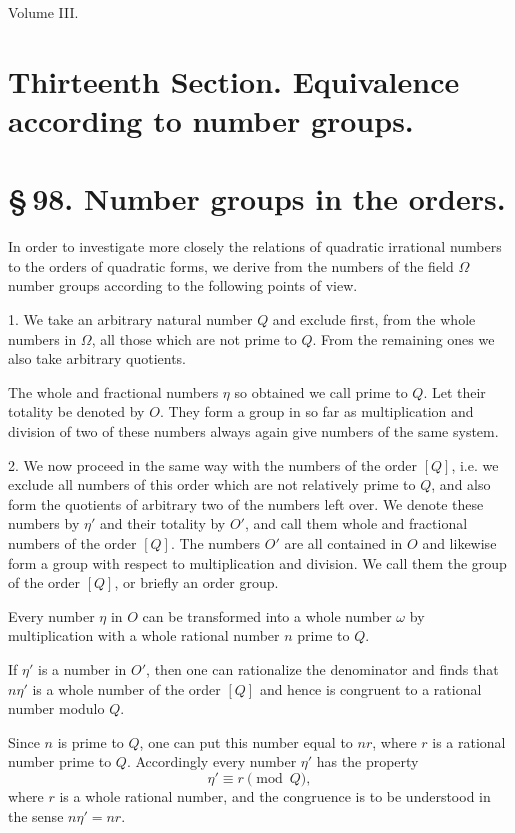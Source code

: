 \documentclass[11pt]{article}
\begin{document}
\begin{center}{\large Volume III.}\end{center}

\section*{Thirteenth Section. Equivalence according to number groups.}

\section*{\S\,98. Number groups in the orders.}

In order to investigate more closely the relations of quadratic irrational numbers to the orders of quadratic forms, we derive from the numbers of the field $\Omega$ number groups according to the following points of view.

1. We take an arbitrary natural number $Q$ and exclude first, from the whole numbers in $\Omega$, all those which are not prime to $Q$. From the remaining ones we also take arbitrary quotients.

The whole and fractional numbers $\eta$ so obtained we call prime to $Q$. Let their totality be denoted by $O$. They form a group in so far as multiplication and division of two of these numbers always again give numbers of the same system.

2. We now proceed in the same way with the numbers of the order $[Q]$, i.e. we exclude all numbers of this order which are not relatively prime to $Q$, and also form the quotients of arbitrary two of the numbers left over. We denote these numbers by $\eta'$ and their totality by $O'$, and call them whole and fractional numbers of the order $[Q]$. The numbers $O'$ are all contained in $O$ and likewise form a group with respect to multiplication and division. We call them the group of the order $[Q]$, or briefly an order group.

Every number $\eta$ in $O$ can be transformed into a whole number $\omega$ by multiplication with a whole rational number $n$ prime to $Q$.

If $\eta'$ is a number in $O'$, then one can rationalize the denominator and finds that $n\eta'$ is a whole number of the order $[Q]$ and hence is congruent to a rational number modulo $Q$.

Since $n$ is prime to $Q$, one can put this number equal to $nr$, where $r$ is a rational number prime to $Q$. Accordingly every number $\eta'$ has the property
\begin{equation}
 \eta'\equiv r\pmod Q,
\tag{1}
\end{equation}
where $r$ is a whole rational number, and the congruence is to be understood in the sense $n\eta'=nr$.
\end{document}
